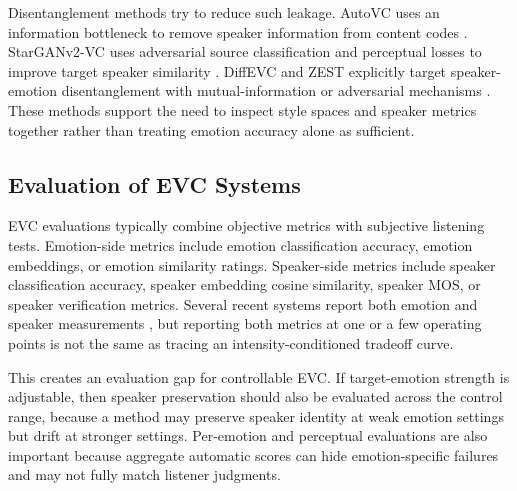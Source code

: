 Disentanglement methods try to reduce such leakage.
AutoVC uses an information bottleneck to remove speaker information from content codes \cite{qian2019autovc}.
StarGANv2-VC uses adversarial source classification and perceptual losses to improve target speaker similarity \cite{li2021starganv2vc}.
DiffEVC and ZEST explicitly target speaker-emotion disentanglement with mutual-information or adversarial mechanisms \cite{chou2024diffevc,dutta2024zest}.
These methods support the need to inspect style spaces and speaker metrics together rather than treating emotion accuracy alone as sufficient.

\subsection{Evaluation of EVC Systems}
EVC evaluations typically combine objective metrics with subjective listening tests.
Emotion-side metrics include emotion classification accuracy, emotion embeddings, or emotion similarity ratings.
Speaker-side metrics include speaker classification accuracy, speaker embedding cosine similarity, speaker MOS, or speaker verification metrics.
Several recent systems report both emotion and speaker measurements \cite{oh2025durflexevc,zuo2025pflowvc,shah2023evcusep,chou2024diffevc}, but reporting both metrics at one or a few operating points is not the same as tracing an intensity-conditioned tradeoff curve.

This creates an evaluation gap for controllable EVC.
If target-emotion strength is adjustable, then speaker preservation should also be evaluated across the control range, because a method may preserve speaker identity at weak emotion settings but drift at stronger settings.
Per-emotion and perceptual evaluations are also important because aggregate automatic scores can hide emotion-specific failures and may not fully match listener judgments.

